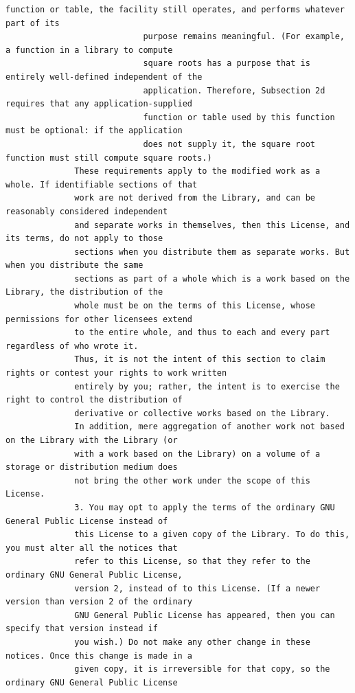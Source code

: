 \begin{lstlisting}[basicstyle=\ttfamily\scriptsize,breaklines=true]
                            function or table, the facility still operates, and performs whatever part of its
                            purpose remains meaningful. (For example, a function in a library to compute
                            square roots has a purpose that is entirely well-defined independent of the
                            application. Therefore, Subsection 2d requires that any application-supplied
                            function or table used by this function must be optional: if the application
                            does not supply it, the square root function must still compute square roots.)
              These requirements apply to the modified work as a whole. If identifiable sections of that
              work are not derived from the Library, and can be reasonably considered independent
              and separate works in themselves, then this License, and its terms, do not apply to those
              sections when you distribute them as separate works. But when you distribute the same
              sections as part of a whole which is a work based on the Library, the distribution of the
              whole must be on the terms of this License, whose permissions for other licensees extend
              to the entire whole, and thus to each and every part regardless of who wrote it.
              Thus, it is not the intent of this section to claim rights or contest your rights to work written
              entirely by you; rather, the intent is to exercise the right to control the distribution of
              derivative or collective works based on the Library.
              In addition, mere aggregation of another work not based on the Library with the Library (or
              with a work based on the Library) on a volume of a storage or distribution medium does
              not bring the other work under the scope of this License.
              3. You may opt to apply the terms of the ordinary GNU General Public License instead of
              this License to a given copy of the Library. To do this, you must alter all the notices that
              refer to this License, so that they refer to the ordinary GNU General Public License,
              version 2, instead of to this License. (If a newer version than version 2 of the ordinary
              GNU General Public License has appeared, then you can specify that version instead if
              you wish.) Do not make any other change in these notices. Once this change is made in a
              given copy, it is irreversible for that copy, so the ordinary GNU General Public License

\end{lstlisting}
